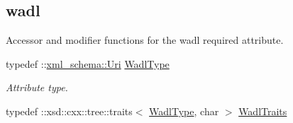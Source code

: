 \subsection*{wadl}
\label{_amgrp3f7c531a0bdde5da5722a91b90394c62}
Accessor and modifier functions for the wadl required attribute. \begin{DoxyCompactItemize}
\item 
\hypertarget{classopenstack_1_1xml_1_1Version_a5a0dce1b88ef63c4fd363ef4f2754a79}{
typedef ::\hyperlink{namespacexml__schema_ae14d61a2e71e44fa4b46c9492c59b44d}{xml\_\-schema::Uri} \hyperlink{classopenstack_1_1xml_1_1Version_a5a0dce1b88ef63c4fd363ef4f2754a79}{WadlType}}
\label{classopenstack_1_1xml_1_1Version_a5a0dce1b88ef63c4fd363ef4f2754a79}

\begin{DoxyCompactList}\small\item\em Attribute type. \item\end{DoxyCompactList}\item 
\hypertarget{classopenstack_1_1xml_1_1Version_a61245dd4ee76fc0dcff355e0d9499aab}{
typedef ::xsd::cxx::tree::traits$<$ \hyperlink{classopenstack_1_1xml_1_1Version_a5a0dce1b88ef63c4fd363ef4f2754a79}{WadlType}, char $>$ \hyperlink{classopenstack_1_1xml_1_1Version_a61245dd4ee76fc0dcff355e0d9499aab}{WadlTraits}}
\label{classopenstack_1_1xml_1_1Version_a61245dd4ee76fc0dcff355e0d9499aab}


\end{DoxyCompactItemize}
